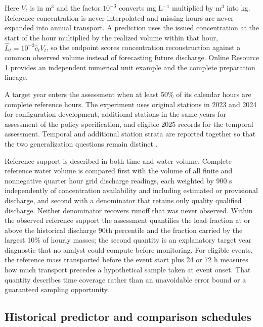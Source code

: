\documentclass[pdflatex,sn-mathphys-num]{sn-jnl}%
\theoremstyle{thmstyleone}%
\theoremstyle{thmstyletwo}%
\theoremstyle{thmstylethree}%
\begin{document}
Here $V_t$ is in m$^{3}$ and the factor $10^{-3}$ converts mg L$^{-1}$ multiplied by m$^{3}$ into kg. Reference concentration is never interpolated and missing hours are never expanded into annual transport. A prediction uses the issued concentration at the start of the hour multiplied by the realized volume within that hour, $\widehat L_t=10^{-3}\widehat c_t V_t$, so the endpoint scores concentration reconstruction against a common observed volume instead of forecasting future discharge. Online Resource 1 provides an independent numerical unit example and the complete preparation lineage.

A target year enters the assessment when at least 50\% of its calendar hours are complete reference hours. The experiment uses original stations in 2023 and 2024 for configuration development, additional stations in the same years for assessment of the policy specification, and eligible 2025 records for the temporal assessment. Temporal and additional station strata are reported together so that the two generalization questions remain distinct \citep{roberts2017}.

Reference support is described in both time and water volume. Complete reference water volume is compared first with the volume of all finite and nonnegative quarter hour grid discharge readings, each weighted by 900 s independently of concentration availability and including estimated or provisional discharge, and second with a denominator that retains only quality qualified discharge. Neither denominator recovers runoff that was never observed. Within the observed reference support the assessment quantifies the load fraction at or above the historical discharge 90th percentile and the fraction carried by the largest 10\% of hourly masses; the second quantity is an explanatory target year diagnostic that no analyst could compute before monitoring. For eligible events, the reference mass transported before the event start plus 24 or 72 h measures how much transport precedes a hypothetical sample taken at event onset. That quantity describes time coverage rather than an unavoidable error bound or a guaranteed sampling opportunity.

\subsection{Historical predictor and comparison schedules}
\end{document}
